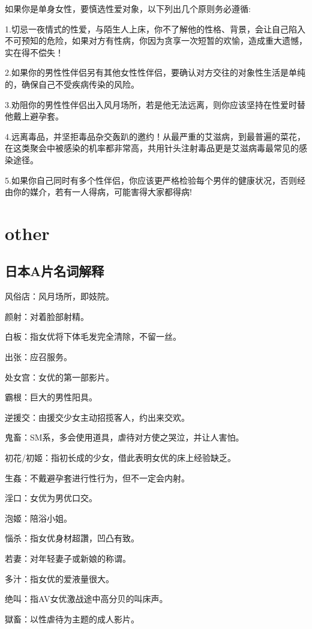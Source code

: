 \documentclass[12pt,UTF8]{ctexbook}
\begin{document}
如果你是单身女性，要慎选性爱对象，以下列出几个原则务必遵循:

1.切忌一夜情式的性爱，与陌生人上床，你不了解他的性格、背景，会让自己陷入不可预知的危险，如果对方有性病，你因为贪享一次短暂的欢愉，造成重大遗憾，实在得不偿失！

2.如果你的男性性伴侣另有其他女性性伴侣，要确认对方交往的对象性生活是单纯的，确保自己不受疾病传染的风险。

3.劝阻你的男性性伴侣出入风月场所，若是他无法远离，则你应该坚持在性爱时替他戴上避孕套。

4.远离毒品，并坚拒毒品杂交轰趴的邀约！从最严重的艾滋病，到最普遍的菜花，在这类聚会中被感染的机率都非常高，共用针头注射毒品更是艾滋病毒最常见的感染途径。

5.如果你自己同时有多个性伴侣，你应该更严格检验每个男伴的健康状况，否则经由你的媒介，若有一人得病，可能害得大家都得病!

\part{other}

\chapter{日本A片名词解释}

风俗店：风月场所，即妓院。

颜射：对着脸部射精。

白板：指女优将下体毛发完全清除，不留一丝。

出张：应召服务。

处女宫：女优的第一部影片。

霸根：巨大的男性阳具。

逆援交：由援交少女主动招揽客人，约出来交欢。

鬼畜：SM系，多会使用道具，虐待对方使之哭泣，并让人害怕。

初花/初姬：指初长成的少女，借此表明女优的床上经验缺乏。

生姦：不戴避孕套进行性行为，但不一定会内射。

淫口：女优为男优口交。

泡姬：陪浴小姐。

惱杀：指女优身材超讚，凹凸有致。

若妻：对年轻妻子或新娘的称谓。

多汁：指女优的爱液量很大。

绝叫：指AV女优激战途中高分贝的叫床声。

獄畜：以性虐待为主题的成人影片。
\end{document}
